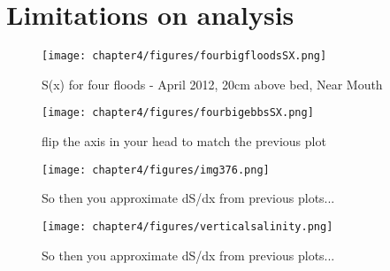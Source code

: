 \section{Limitations on analysis}



\begin{figure}
	\texttt{[image: chapter4/figures/fourbigfloodsSX.png]} 
\caption{S(x) for four floods - April 2012, 20cm above bed, Near Mouth} \label{fig:fourfloods}
\end{figure}


\begin{figure}
	\texttt{[image: chapter4/figures/fourbigebbsSX.png]} \caption{flip the axis in your head to match the previous plot} \label{fig:fourebbs}
\end{figure}

\begin{figure}
	\texttt{[image: chapter4/figures/img376.png]} \caption{So then you approximate dS/dx from previous plots...} \label{fig:fourebbs}
\end{figure}


\begin{figure}
	\texttt{[image: chapter4/figures/verticalsalinity.png]} \caption{So then you approximate dS/dx from previous plots...} \label{fig:fourebbs}
\end{figure}

